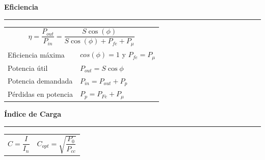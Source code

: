 \documentclass[11pt,a4paper]{article}
\newcommand{\subtitulo}[1]{
	\textbf{#1} \\ \vspace{.1cm} {\color{gray} \hrule}
}
\begin{document}
\begin{cajita}
		
		
		
		
		\subtitulo{Eficiencia \vspace{.1cm}} 
		\vspace{.3cm}
		
		\begin{tabular}{l l}
			\multicolumn{2}{c}{$\eta = \dfrac{P_{out}}{P_{in}}= \dfrac{S \cos(\phi)}{S \cos(\phi )+P_{fe}+P_{\mu}}$\vspace{.2cm}}\\
			
			Eficiencia máxima & $cos(\phi)=1$ y $ P_{fe}=P_{\mu }$ \\
			Potencia útil & $P_{out} = S \cos \phi$\\
			Potencia demandada & $P_{in} = P_{out} + P_{p}$\\
			Pérdidas en potencia & $P_p = P_{Fe} + P_\mu$\\
		\end{tabular}
		
		\vspace{.3cm}
		
		\subtitulo{Índice de Carga}
		\vspace{.3cm}
		
		\begin{tabular}{l l}
			$C = \dfrac{I}{I_n}$ & $C_{opt} = \sqrt{\dfrac{P_0}{P_{cc}}}$\\
		\end{tabular}
		
		
	
	
	
\end{cajita}
\end{document}
